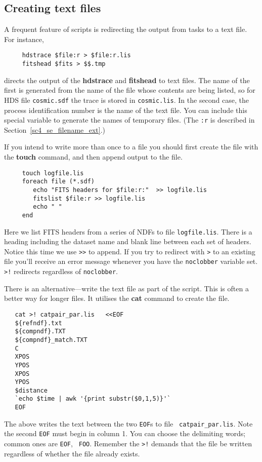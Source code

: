 \documentclass[twoside,11pt]{article}
\newcommand{\htmlref}[2]{#1}
\newcommand{\xref}[3]{#1}
\newcommand{\xlabel}[1]{}
\newcommand{\latexelsehtml}[2]{#1}
\newcommand{\latexelsehtml}[2]{#2}
\newcommand{\HDSref}{\xref{HDS}{sun92}{}}
\newcommand{\NDFref}[1]{\xref{#1}{sun33}{}}
\begin{document}
\newpage
\subsection{\xlabel{sc4_se_create_textfiles}Creating text files
\label{sc4_se_create_textfiles}}

A frequent feature of scripts is redirecting the output from tasks to a
text file.  For instance,

\small
\begin{verbatim}
     hdstrace $file:r > $file:r.lis
     fitshead $fits > $$.tmp
\end{verbatim}
\normalsize
directs the output of the \xref{{\bf hdstrace}}{sun102}{} and {\bf
fitshead} to text files. The name of the first is generated from the
name of the file whose contents are being listed, so for {\sf \HDSref}
file {\tt cosmic.sdf} the trace is stored in {\tt cosmic.lis}.  In the
second case, the \htmlref{{\sf process identification
number}}{sc4_gl_pro} is the name of the text file.  You can include
this special variable to generate the names of temporary files.  (The
{\tt :r} is described \latexelsehtml{in
Section~\ref{sc4_se_filename_ext}.)}{\htmlref{here}{sc4_se_filename_ext}.)}

If you intend to write more than once to a file you should first create
the file with the {\bf touch} command, and then append output to the file.

\small
\begin{verbatim}
     touch logfile.lis
     foreach file (*.sdf)
        echo "FITS headers for $file:r:"  >> logfile.lis
        fitslist $file:r >> logfile.lis
        echo " "
     end
\end{verbatim}
\normalsize
Here we list \htmlref{{\sf FITS}}{sc4_gl_fits} headers from a series of \NDFref{{\sf NDF}s}
to file {\tt logfile.lis}.  There is a heading including the dataset
name and blank line between each set of headers.  Notice this time
we use {\tt >>} to append.  If you try to redirect with {\tt >}
to an existing file you'll receive an error message whenever you have
the {\tt noclobber} variable set.  {\tt >!} redirects regardless
of {\tt noclobber}.
\bigskip\medskip

There is an alternative---write the text file as part of the script.
This is often a better way for longer files.  It utilises
the {\bf cat} command to create the file.

\small
\begin{verbatim}
   cat >! catpair_par.lis   <<EOF
   ${refndf}.txt
   ${compndf}.TXT
   ${compndf}_match.TXT
   C
   XPOS
   YPOS
   XPOS
   YPOS
   $distance
   `echo $time | awk '{print substr($0,1,5)}'`
   EOF
\end{verbatim}
\normalsize
The above writes the text between the two {\tt EOF}s to file {\tt
catpair\_par.lis}.  Note the second {\tt EOF} must begin in column 1.
You can choose the delimiting words; common ones are {\tt EOF}, {\tt
FOO}.  Remember the {\tt >!} demands that the file be written
regardless of whether the file already exists.
\end{document}
